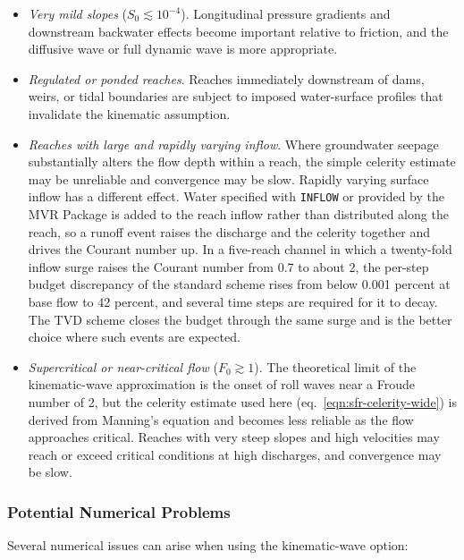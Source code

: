 \begin{itemize}

	\item \textit{Very mild slopes} ($S_0 \lesssim 10^{-4}$). Longitudinal pressure gradients and downstream backwater effects become important relative to friction, and the diffusive wave or full dynamic wave is more appropriate.

	\item \textit{Regulated or ponded reaches}. Reaches immediately downstream of dams, weirs, or tidal boundaries are subject to imposed water-surface profiles that invalidate the kinematic assumption.

	\item \textit{Reaches with large and rapidly varying inflow}. Where groundwater seepage substantially alters the flow depth within a reach, the simple celerity estimate may be unreliable and convergence may be slow. Rapidly varying surface inflow has a different effect. Water specified with \texttt{INFLOW} or provided by the MVR Package is added to the reach inflow rather than distributed along the reach, so a runoff event raises the discharge and the celerity together and drives the Courant number up. In a five-reach channel in which a twenty-fold inflow surge raises the Courant number from 0.7 to about 2, the per-step budget discrepancy of the standard scheme rises from below 0.001 percent at base flow to 42 percent, and several time steps are required for it to decay. The TVD scheme closes the budget through the same surge and is the better choice where such events are expected.

	\item \textit{Supercritical or near-critical flow} ($F_0 \gtrsim 1$). The theoretical limit of the kinematic-wave approximation is the onset of roll waves near a Froude number of 2, but the celerity estimate used here (eq.~\ref{eqn:sfr-celerity-wide}) is derived from Manning's equation and becomes less reliable as the flow approaches critical. Reaches with very steep slopes and high velocities may reach or exceed critical conditions at high discharges, and convergence may be slow.

\end{itemize}

\subsubsection{Potential Numerical Problems}

Several numerical issues can arise when using the kinematic-wave option:

